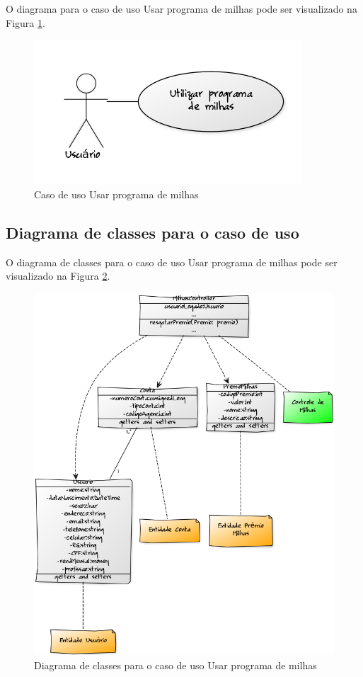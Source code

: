O diagrama para o caso de uso Usar programa de milhas pode ser visualizado na Figura \ref{cdu:programaMilhas}.

\begin{figure}[!htb]
     \centering
     \includegraphics[scale=0.6]{diagramas/caso-de-uso/imagens/utilizarProgramaMilhas.png}
     \caption{Caso de uso Usar programa de milhas}
     \label{cdu:programaMilhas}
\end{figure}

\subsection{Diagrama de classes para o caso de uso}

O diagrama de classes para o caso de uso Usar programa de milhas pode ser visualizado na Figura \ref{ddc:milhas}.

\begin{figure}[!htb]
     \centering
     \includegraphics[scale=0.5]{diagramas/diagrama-de-classe/imagens/milhas.png}
     \caption{Diagrama de classes para o caso de uso Usar programa de milhas}
     \label{ddc:milhas}
\end{figure}
